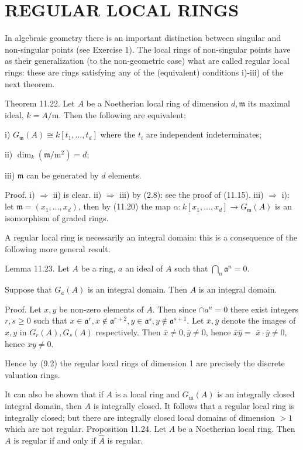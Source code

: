 \documentclass{standalone}
\theoremstyle{definition}
\theoremstyle{remark}
\begin{document}
\section{REGULAR LOCAL RINGS}
In algebraic geometry there is an important distinction between singular and non-singular points (see Exercise 1). The local rings of non-singular points have as their generalization (to the non-geometric case) what are called regular local rings: these are rings satisfying any of the (equivalent) conditions i)-iii) of the next theorem.

Theorem 11.22. Let $A$ be a Noetherian local ring of dimension $d, \mathfrak{m}$ its maximal ideal, $k=A / \mathrm{m}$. Then the following are equivalent:

i) $G_{\mathfrak{m}}(A) \cong k\left[t_{1}, \ldots, t_{d}\right]$ where the $t_{i}$ are independent indeterminates;

ii) $\operatorname{dim}_{k}\left(\mathfrak{m} / \mathrm{m}^{2}\right)=d$;

iii) $\mathfrak{m}$ can be generated by $d$ elements.

Proof. i) $\Rightarrow$ ii) is clear. ii) $\Rightarrow$ iii) by (2.8): see the proof of (11.15). iii) $\Rightarrow$ i): let $\mathfrak{m}=\left(x_{1}, \ldots, x_{d}\right)$, then by (11.20) the map $\alpha: k\left[x_{1}, \ldots, x_{d}\right] \rightarrow G_{\mathfrak{m}}(A)$ is an isomorphism of graded rings.

A regular local ring is necessarily an integral domain: this is a consequence of the following more general result.

Lemma 11.23. Let $A$ be a ring, $a$ an ideal of $A$ such that $\bigcap_{n} \mathfrak{a}^{n}=0$.

Suppose that $G_{a}(A)$ is an integral domain. Then $A$ is an integral domain.

Proof. Let $x, y$ be non-zero elements of $A$. Then since $\cap a^{n}=0$ there exist integers $r, s \geqslant 0$ such that $x \in \mathfrak{a}^{r}, x \notin \mathfrak{a}^{r+2}, y \in \mathfrak{a}^{s}, y \notin \mathfrak{a}^{s+1}$. Let $\bar{x}, \bar{y}$ denote the images of $x, y$ in $G_{r}(A), G_{s}(A)$ respectively. Then $\bar{x} \neq 0, \bar{y} \neq 0$, hence $\bar{x} \bar{y}=$ $\bar{x} \cdot \bar{y} \neq 0$, hence $x y \neq 0$.

Hence by (9.2) the regular local rings of dimension 1 are precisely the discrete valuation rings.

It can also be shown that if $A$ is a local ring and $G_{\mathrm{m}}(A)$ is an integrally closed integral domain, then $A$ is integrally closed. It follows that a regular local ring is integrally closed; but there are integrally closed local domains of dimension $>1$ which are not regular. Proposition 11.24. Let $A$ be a Noetherian local ring. Then $A$ is regular if and only if $\hat{A}$ is regular.
\end{document}
